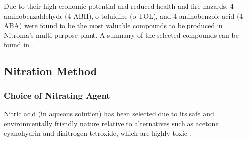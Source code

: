 Due to their high economic potential and reduced health and fire hazards, 4-aminobenzaldehyde (4-ABH), o-toluidine (o-TOL), and 4-aminobenzoic acid (4-ABA) were found to be the most valuable compounds to be produced in Nitroma's multi-purpose plant. A  summary of the selected compounds can be found in .


\subsection{Nitration Method}
\subsubsection{Choice of Nitrating Agent}
Nitric acid (in aqueous solution) has been selected due to its safe and environmentally friendly nature relative to alternatives such as acetone cyanohydrin and dinitrogen tetroxide, which are highly toxic \cite{miller_kinetics_1964,dagade_nitration_2002, sreedhar_scientific_2013}. 

\begin{comment}
Nitric acid has been selected as the source of nitrogen for the nitration of toluene for its safe and environmentally friendly nature relative to other possible nitrating agents, high availability, and its various favourable properties \cite{miller_kinetics_1964, sreedhar_scientific_2013}. Although nitric acid is a highly acidic and volatile compound, compared to alternatives such as acetone cyanohydrin and dinitrogen tetroxide which are highly toxic, nitric acid is more appropriate for industrial-scale nitration of toluene \cite{dagade_nitration_2002, sreedhar_scientific_2013}. Nitric acid, introduced as an aqueous solution, is the most commonly used and well-studied nitrating agent for this process in industry. \cite{bowers_toluidines_2000} A big advantage of aqueous nitric acid is that it can act as a self-catalyst by self-donating protons. \cite{miller_kinetics_1964} A common alternative to nitric acid is acetyl nitrate which is formed by the reaction of nitric acid with acetic anhydride. \cite{vassena_selective_1999} This reaction yields formic acid as by-product, resulting in a lower atom economy; it also causes unnecessary difficulties in separations downstream by introducing three extra components: acetyl nitrate, acetic anhydride, and formic acid. The same argument can be employed for other alkyl nitrates such as butyl nitrate. To this end, nitric acid is deemed as the most suitable choice among all candidates.
\end{comment}

